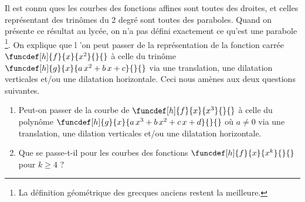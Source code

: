 Il est connu ques les courbes des fonctions affines sont toutes des droites, et celles représentant des trinômes du 2\ieme{} degré sont toutes des paraboles. Quand on présente ce résultat au lycée, on n'a pas défini exactement ce qu'est une parabole
\footnote{
	La définition géométrique des grecques anciens restent la meilleure.
}.
On explique que l 'on peut passer de la représentation de la fonction carrée
$\funcdef[h]{f}{x}{x^2}{}{}$
à celle du trinôme
$\funcdef[h]{g}{x}{a \, x^2 + b \, x + c}{}{}$
via une translation, une dilatation verticales et/ou une dilatation horizontale.
Ceci nous amènes aux deux questions suivantes.
\begin{enumerate}	
	\item Peut-on passer de la courbe de
	      $\funcdef[h]{f}{x}{x^3}{}{}$
		  à celle du polynôme
		  $\funcdef[h]{g}{x}{a \, x^3 + b \, x^2 + c \, x + d}{}{}$
		  où $a\neq 0$
		  via une translation, une dilation verticales et/ou une dilatation horizontale.

	\item Que se passe-t-il pour les courbes des fonctions
	      $\funcdef[h]{f}{x}{x^k}{}{}$
		  pour $k \geq 4$ ?
\end{enumerate}

 